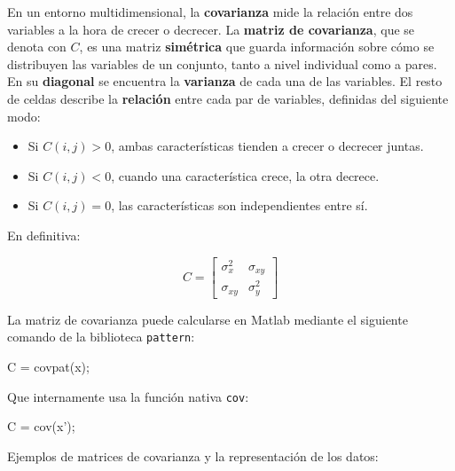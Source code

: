\documentclass[11pt]{scrartcl}
\begin{document}
En un entorno multidimensional, la \textbf{covarianza} mide la relación entre
dos variables a la hora de crecer o decrecer. La \textbf{matriz de covarianza},
que se denota con $C$, es una matriz \textbf{simétrica} que guarda información
sobre cómo se distribuyen las variables de un conjunto, tanto a nivel individual
como a pares. En su \textbf{diagonal} se encuentra la \textbf{varianza} de cada
una de las variables. El resto de celdas describe la \textbf{relación} entre
cada par de variables, definidas del siguiente modo:

\begin{itemize}
\item Si $C(i,j)>0$, ambas características tienden a crecer o decrecer juntas.
\item Si $C(i,j)<0$, cuando una característica crece, la otra decrece.
\item Si $C(i,j)=0$, las características son independientes entre sí.
\end{itemize}

En definitiva:

$$
C = \begin{bmatrix}
\sigma^2_x  & \sigma_{xy} \\
\sigma_{xy} & \sigma^2_y 
\end{bmatrix}
$$

La matriz de covarianza puede calcularse en Matlab mediante el siguiente comando
de la biblioteca \texttt{pattern}:

\begin{matlabcode}
C = covpat(x);  
\end{matlabcode}

Que internamente usa la función nativa \texttt{cov}:

\begin{matlabcode}
C = cov(x');
\end{matlabcode}

Ejemplos de matrices de covarianza y la representación de los datos:
\end{document}
